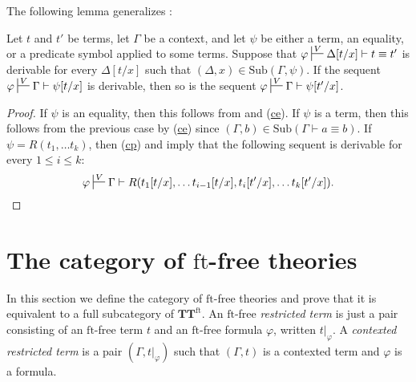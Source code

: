 \documentclass[reqno]{amsart}
\newcommand{\axref}[1]{(\hyperref[ax:#1]{#1})}
\theoremstyle{definition}
\theoremstyle{remark}
\newcommand{\fs}[1]{\mathrm{#1}}
\newcommand{\ft}{\fs{ft}}
\newcommand{\sub}{\fs{Sub}}
\newcommand{\cat}[1]{\mathbf{#1}}
\newcommand{\algtt}{\cat{TT}}
\numberwithin{figure}{section}
\begin{document}
The following lemma generalizes :

\begin{lem}
Let $t$ and $t'$ be terms, let $\Gamma$ be a context, and let $\psi$ be either a term, an equality, or a predicate symbol applied to some terms.
Suppose that $\varphi \sststile{}{V} \Delta[t/x] \vdash t \equiv t'$ is derivable for every $\Delta[t/x]$ such that $(\Delta,x) \in \sub(\Gamma,\psi)$.
If the sequent $\varphi \sststile{}{V} \Gamma \vdash \psi[t/x]$ is derivable, then so is the sequent $\varphi \sststile{}{V} \Gamma \vdash \psi[t'/x]$.
\end{lem}
\begin{proof}
If $\psi$ is an equality, then this follows from  and \axref{ce}.
If $\psi$ is a term, then this follows from the previous case by \axref{ce} since $(\Gamma,b) \in \sub(\Gamma \vdash a \equiv b)$.
If $\psi = R(t_1, \ldots t_k)$, then \axref{cp} and  imply that the following sequent is derivable for every $1 \leq i \leq k$:
\[ \varphi \sststile{}{V} \Gamma \vdash R(t_1[t/x], \ldots t_{i-1}[t/x], t_i[t'/x], \ldots t_k[t'/x]). \]
\end{proof}

\section{The category of $\ft$-free theories}

In this section we define the category of $\ft$-free theories and prove that it is equivalent to a full subcategory of $\algtt^\ft$.
An $\ft$-free \emph{restricted term} is just a pair consisting of an $\ft$-free term $t$ and an $\ft$-free formula $\varphi$, written $t|_\varphi$.
A \emph{contexted restricted term} is a pair $(\Gamma,t|_\varphi)$ such that $(\Gamma,t)$ is a contexted term and $\varphi$ is a formula.
\end{document}
